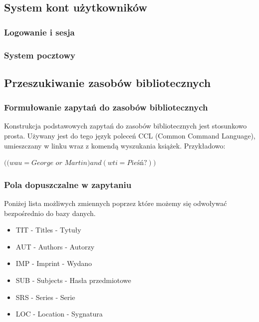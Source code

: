 \documentclass{report}
\begin{document}
		\subsection{System kont użytkowników}
		
			\subsubsection{Logowanie i sesja}
			
			\subsubsection{System pocztowy}
		
		\subsection{Przeszukiwanie zasobów bibliotecznych}
		
			\subsubsection{Formułowanie zapytań do zasobów bibliotecznych}
		
				Konstrukcja podstawowych zapytań do zasobów bibliotecznych jest stosunkowo prosta. Używany jest do tego język poleceń CCL (Common Command Language), umieszczany w linku wraz z komendą wyszukania książek. Przykładowo:
				
				\begin{center}
					$ ((wau=George$ $or$ $Martin) and (wti=Pieśń?)) $\\
				\end{center}

			\subsubsection{Pola dopuszczalne w zapytaniu}
			
				Poniżej lista możliwych zmiennych poprzez które możemy się odwoływać bezpośrednio do bazy danych.
				
				\begin{itemize}
					\item TIT - Titles - Tytuły
					\item AUT - Authors - Autorzy
					\item IMP - Imprint - Wydano
					\item SUB - Subjects - Hasła przedmiotowe
					\item SRS - Series - Serie
					\item LOC - Location - Sygnatura
				\end{itemize}
				
\end{document}
